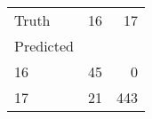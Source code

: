 \begin{tabular}{lrr}
\toprule
Truth & 16 & 17 \\
Predicted &  &  \\
\midrule
16 & 45 & 0 \\
17 & 21 & 443 \\
\bottomrule
\end{tabular}
